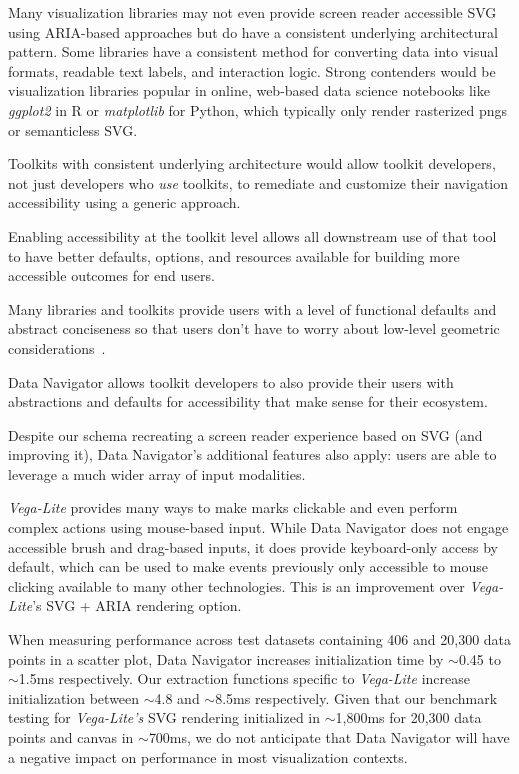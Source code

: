 \documentclass[12pt]{cmuthesis}
\begin{document}
Many visualization libraries may not even provide screen reader accessible SVG using ARIA-based approaches but do have a consistent underlying architectural pattern. Some libraries have a consistent method for converting data into visual formats, readable text labels, and interaction logic. Strong contenders would be visualization libraries popular in online, web-based data science notebooks like \textit{ggplot2} in R or \textit{matplotlib} for Python, which typically only render rasterized pngs or semanticless SVG.

Toolkits with consistent underlying architecture would allow toolkit developers, not just developers who \textit{use} toolkits, to remediate and customize their navigation accessibility using a generic approach.

Enabling accessibility at the toolkit level allows all downstream use of that tool to have better defaults, options, and resources available for building more accessible outcomes for end users.

Many libraries and toolkits provide users with a level of functional defaults and abstract conciseness so that users don't have to worry about low-level geometric considerations~\cite{Satyanarayan2017VegaLite}.

Data Navigator allows toolkit developers to also provide their users with abstractions and defaults for accessibility that make sense for their ecosystem.

Despite our schema recreating a screen reader experience based on SVG (and improving it), Data Navigator's additional features also apply: users are able to leverage a much wider array of input modalities.

\textit{Vega-Lite} provides many ways to make marks clickable and even perform complex actions using mouse-based input. While Data Navigator does not engage accessible brush and drag-based inputs, it does provide keyboard-only access by default, which can be used to make events previously only accessible to mouse clicking available to many other technologies. This is an improvement over \textit{Vega-Lite}'s SVG + ARIA rendering option.

When measuring performance across test datasets containing 406 and 20,300 data points in a scatter plot, Data Navigator increases initialization time by $\sim$0.45 to $\sim$1.5ms respectively. Our extraction functions specific to \textit{Vega-Lite} increase initialization between $\sim$4.8 and $\sim$8.5ms respectively. Given that our benchmark testing for \textit{Vega-Lite's} SVG rendering initialized in $\sim$1,800ms for 20,300 data points and canvas in $\sim$700ms, we do not anticipate that Data Navigator will have a negative impact on performance in most visualization contexts.
\end{document}
